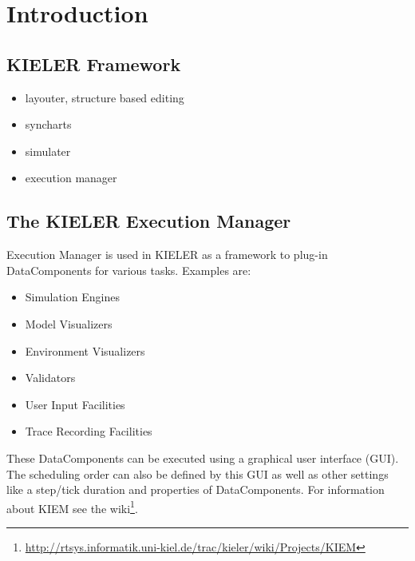 

\chapter{Introduction}
\label{chapter:introduction}
\section{KIELER Framework}
\label{sec:intro/Kieler}
\begin{itemize}
 \item layouter, structure based editing
 \item syncharts
 \item simulater
 \item execution manager
\end{itemize}
\section{The KIELER Execution Manager}
\label{sec:intro/Kiem}
Execution Manager is used in KIELER as a framework to plug-in DataComponents for various tasks. Examples are:
\begin{itemize}
 \item Simulation Engines
 \item Model Visualizers
 \item Environment Visualizers
 \item Validators
 \item User Input Facilities
 \item Trace Recording Facilities 
\end{itemize}

These DataComponents can be executed using a graphical user interface (GUI). 
The scheduling order can also be defined by this GUI as well as other settings like a step/tick duration and properties of DataComponents.
For information about \ac{KIEM} see the wiki\footnote{\url{http://rtsys.informatik.uni-kiel.de/trac/kieler/wiki/Projects/KIEM}}.
